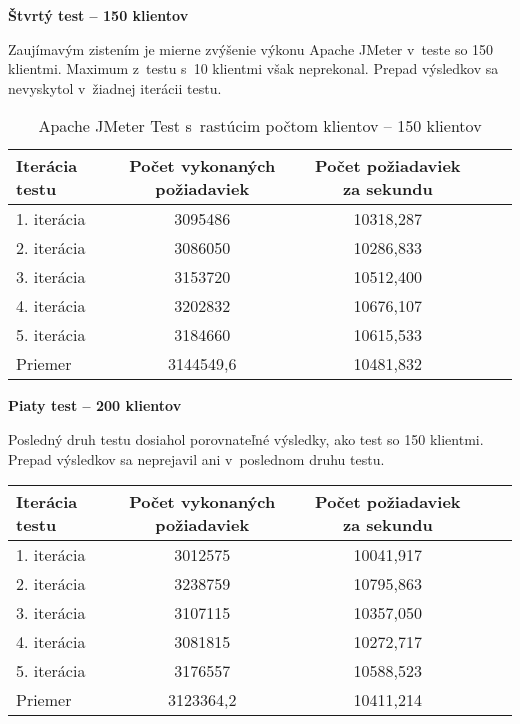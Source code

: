 \documentclass[12pt,oneside,final]{fithesis-utf8}
\begin{document}
\begin{itemize}
\textbf{Štvrtý test -- 150 klientov}

Zaujímavým zistením je mierne zvýšenie výkonu Apache JMeter v~teste so 150 klientmi. Maximum z~testu s~10 klientmi však neprekonal. Prepad výsledkov sa nevyskytol v~žiadnej iterácii testu.

\begin{table}[H]
\begin{center}
\begin{tabular}{ | l | c | c | c | c |}
		\hline
		 \textbf{Iterácia testu} & \textbf{Počet vykonaných požiadaviek} & \textbf{Počet požiadaviek za sekundu} \\ \hline
		 1. iterácia & 3095486 & 10318,287 \\ \hline
		 2. iterácia & 3086050 & 10286,833 \\ \hline
		 3. iterácia & 3153720 & 10512,400 \\ \hline
		 4. iterácia & 3202832 & 10676,107 \\ \hline
		 5. iterácia & 3184660 & 10615,533 \\ \hline
		 Priemer & 3144549,6 & 10481,832 \\ \hline
		 
\end{tabular}
\end{center}
\caption{Apache JMeter Test s~rastúcim počtom klientov -- 150 klientov}
\end{table}


\textbf{Piaty test -- 200 klientov}

Posledný druh testu dosiahol porovnateľné výsledky, ako test so 150 klientmi. Prepad výsledkov sa neprejavil ani v~poslednom druhu testu.

\begin{table}[H]
\begin{center}
\begin{tabular}{ | l | c | c | c | c |}
		\hline
		 \textbf{Iterácia testu} & \textbf{Počet vykonaných požiadaviek} & \textbf{Počet požiadaviek za sekundu} \\ \hline
		 1. iterácia & 3012575 & 10041,917 \\ \hline
		 2. iterácia & 3238759 & 10795,863 \\ \hline
		 3. iterácia & 3107115 & 10357,050 \\ \hline
		 4. iterácia & 3081815 & 10272,717 \\ \hline
		 5. iterácia & 3176557 & 10588,523 \\ \hline
		 Priemer & 3123364,2 & 10411,214 \\ \hline
		 

\end{tabular}
\end{center}
\end{table}
\end{itemize}
\end{document}
